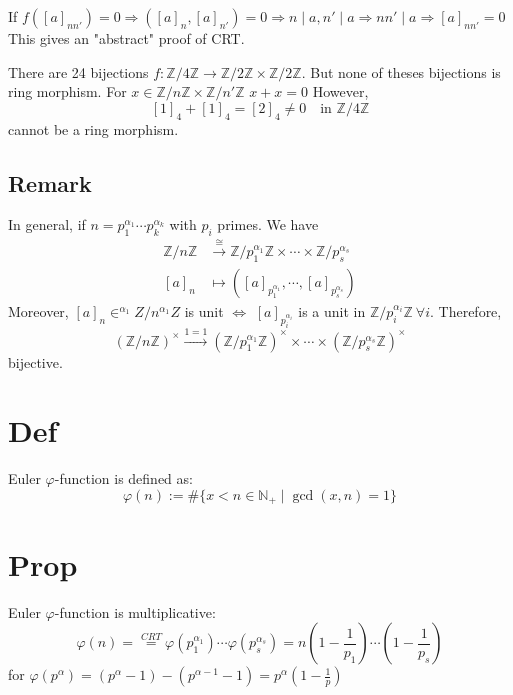 \documentclass{book}
\newcommand{\zmod}[1]{\mathbb Z/#1\mathbb Z}
\begin{document}
If $f([a]_{nn'})=0\Rightarrow ([a]_n,[a]_{n'})=0\Rightarrow n\mid a,n'\mid a\Rightarrow nn'\mid a\Rightarrow [a]_{nn'}=0$
This gives an "abstract" proof of CRT.

There are 24 bijections $f:\zmod 4\rightarrow\zmod 2\times \zmod 2$. But none of theses bijections is ring morphism. For $x\in \mathbb Z/n\mathbb Z\times\mathbb Z/n'\mathbb Z$ $x+x=0$ However,$$[1]_4+[1]_4=[2]_4\neq 0\quad \text{in } \mathbb Z/4\mathbb Z$$cannot be a ring morphism.
\subsection*{Remark}
In general, if $n=p_1^{\alpha_1}\cdots p_k^{\alpha_k}$ with $p_i$ primes.
We have $$
\begin{aligned}
	\mathbb Z/n\mathbb Z&\stackrel{\cong}{\rightarrow}\mathbb Z/p_1^{\alpha_1}\mathbb Z\times\cdots\times\mathbb Z/p_s^{\alpha_s}\\
	[a]_n&\mapsto([a]_{p_1^{\alpha_1}},\cdots,[a]_{p_s^{\alpha_s}})
\end{aligned}
$$
Moreover, $[a]_n\in ^{\alpha_1}Z/n^{\alpha_1}Z$ is unit $\Leftrightarrow$ $[a]_{p_i^{\alpha_i}}$ is a unit in $\mathbb Z/p_i^{\alpha_i}\mathbb Z\ \forall i$. Therefore,
$$(\zmod n)^\times\stackrel{1=1}{\rightarrow}(\zmod{p_1^{\alpha_1}})^\times\times\cdots\times(\zmod{p_s^{\alpha_s}})^\times$$bijective.
\section{Def}
Euler $\varphi$-function is defined as:$$\varphi(n):=\#\{x<n\in \mathbb N_+\mid \gcd(x,n)=1\}$$
\section{Prop}
Euler $\varphi$-function is multiplicative:$$\varphi(n)=\stackrel{CRT}{=}\varphi(p_1^{\alpha_1})\cdots\varphi(p_s^{\alpha_s})=n(1-\frac{1}{p_1})\cdots(1-\frac{1}{p_s})$$
for $\varphi(p^\alpha)=(p^\alpha-1)-(p^{\alpha-1}-1)=p^\alpha(1-\frac{1}{p})$
\end{document}
